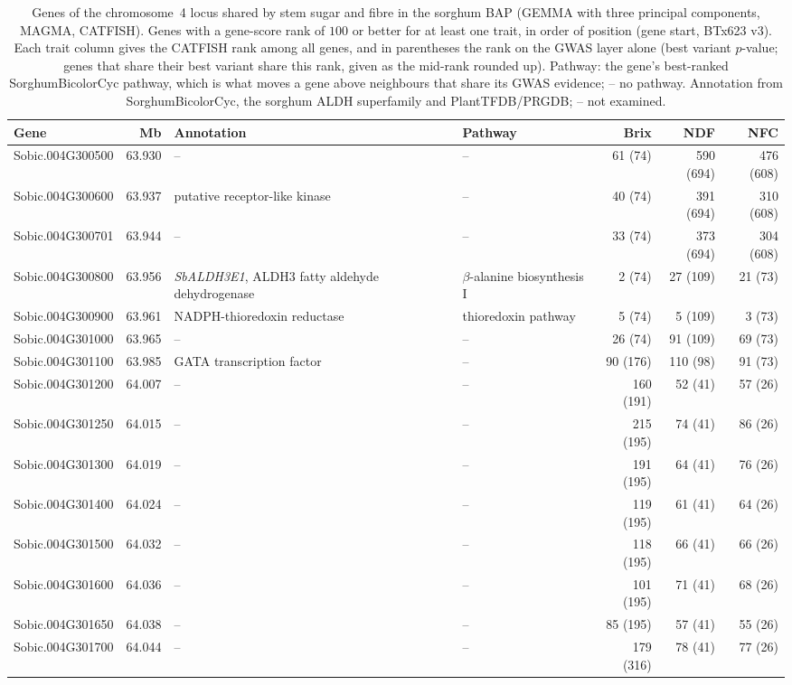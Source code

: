 \begin{table}[!t]
\centering
\caption{Genes of the chromosome~4 locus shared by stem sugar and fibre in the sorghum BAP (GEMMA with three principal components, MAGMA, CATFISH). Genes with a gene-score rank of $100$ or better for at least one trait, in order of position (gene start, BTx623 v3). Each trait column gives the CATFISH rank among all genes, and in parentheses the rank on the GWAS layer alone (best variant $p$-value; genes that share their best variant share this rank, given as the mid-rank rounded up). Pathway: the gene's best-ranked SorghumBicolorCyc pathway, which is what moves a gene above neighbours that share its GWAS evidence; -- no pathway. Annotation from SorghumBicolorCyc, the sorghum ALDH superfamily \citep{Islam2022SbALDH} and PlantTFDB/PRGDB; -- not examined.}
\label{tab:bap_chr4}
\small
\begin{tabular*}{\linewidth}{@{\extracolsep{\fill}}lrp{4.4cm}p{3.6cm}rrr}
\hline
\textbf{Gene} & \textbf{Mb} & \textbf{Annotation} & \textbf{Pathway} & \textbf{Brix} & \textbf{NDF} & \textbf{NFC} \\
\hline
Sobic.004G300500 & 63.930 & -- & -- & 61 (74) & 590 (694) & 476 (608) \\
Sobic.004G300600 & 63.937 & putative receptor-like kinase & -- & 40 (74) & 391 (694) & 310 (608) \\
Sobic.004G300701 & 63.944 & -- & -- & 33 (74) & 373 (694) & 304 (608) \\
Sobic.004G300800 & 63.956 & \textit{SbALDH3E1}, ALDH3 fatty aldehyde dehydrogenase & $\beta$-alanine biosynthesis I & 2 (74) & 27 (109) & 21 (73) \\
Sobic.004G300900 & 63.961 & NADPH-thioredoxin reductase & thioredoxin pathway & 5 (74) & 5 (109) & 3 (73) \\
Sobic.004G301000 & 63.965 & -- & -- & 26 (74) & 91 (109) & 69 (73) \\
Sobic.004G301100 & 63.985 & GATA transcription factor & -- & 90 (176) & 110 (98) & 91 (73) \\
Sobic.004G301200 & 64.007 & -- & -- & 160 (191) & 52 (41) & 57 (26) \\
Sobic.004G301250 & 64.015 & -- & -- & 215 (195) & 74 (41) & 86 (26) \\
Sobic.004G301300 & 64.019 & -- & -- & 191 (195) & 64 (41) & 76 (26) \\
Sobic.004G301400 & 64.024 & -- & -- & 119 (195) & 61 (41) & 64 (26) \\
Sobic.004G301500 & 64.032 & -- & -- & 118 (195) & 66 (41) & 66 (26) \\
Sobic.004G301600 & 64.036 & -- & -- & 101 (195) & 71 (41) & 68 (26) \\
Sobic.004G301650 & 64.038 & -- & -- & 85 (195) & 57 (41) & 55 (26) \\
Sobic.004G301700 & 64.044 & -- & -- & 179 (316) & 78 (41) & 77 (26) \\
\hline
\end{tabular*}
\end{table}
